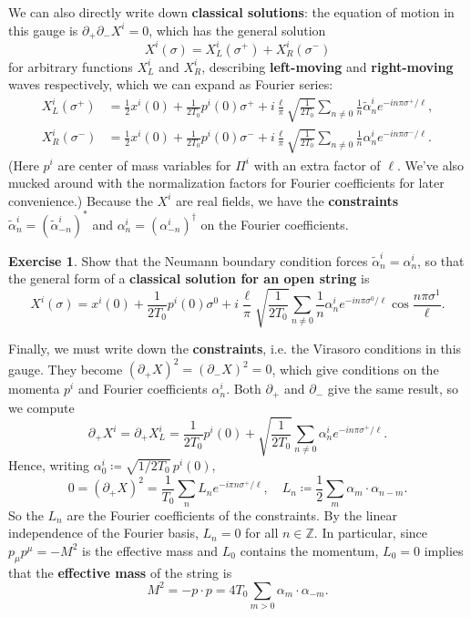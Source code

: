 \documentclass{report}
\theoremstyle{plain}
\theoremstyle{definition}
\newtheorem{exercise}{Exercise}[section]
\theoremstyle{remark}
\newcommand{\di}{\partial}
\newcommand{\bZ}{\mathbb{Z}}
\begin{document}
We can also directly write down {\bf classical solutions}: the
equation of motion in this gauge is $\di_+ \di_- X^i = 0$, which has
the general solution
\[ X^i(\sigma) = X^i_L(\sigma^+) + X^i_R(\sigma^-) \]
for arbitrary functions $X^i_L$ and $X^i_R$, describing {\bf
  left-moving} and {\bf right-moving} waves respectively, which we can
expand as Fourier series:
\begin{align*}
  X^i_L(\sigma^+) &= \frac{1}{2}x^i(0) + \frac{1}{2T_0} p^i(0) \sigma^+ + i\frac{\ell}{\pi}\sqrt{\frac{1}{2T_0}} \sum_{n \neq 0} \frac{1}{n} \tilde{\alpha}_n^i e^{-in\pi\sigma^+/\ell}, \\
  X^i_R(\sigma^-) &= \frac{1}{2}x^i(0) + \frac{1}{2T_0} p^i(0) \sigma^- + i\frac{\ell}{\pi}\sqrt{\frac{1}{2T_0}} \sum_{n \neq 0} \frac{1}{n} \alpha_n^i e^{-in\pi\sigma^-/\ell}.
\end{align*}
(Here $p^i$ are center of mass variables for $\Pi^i$ with an extra
factor of $\ell$. We've also mucked around with the normalization
factors for Fourier coefficients for later convenience.) Because the
$X^i$ are real fields, we have the {\bf constraints}
$\tilde{\alpha}^i_n = (\tilde{\alpha}^i_{-n})^*$ and $\alpha^i_n =
(\alpha^i_{-n})^\dag$ on the Fourier coefficients.

\begin{exercise}
  Show that the Neumann boundary condition forces $\tilde{\alpha}_n^i
  = \alpha_n^i$, so that the general form of a {\bf classical solution
    for an open string} is
  \[ X^i(\sigma) = x^i(0) + \frac{1}{2T_0}p^i(0)\sigma^0 + i\frac{\ell}{\pi}\sqrt{\frac{1}{2T_0}} \sum_{n \neq 0} \frac{1}{n} \alpha_n^i e^{-in\pi\sigma^0/\ell} \cos \frac{n\pi\sigma^1}{\ell}. \]
\end{exercise}

Finally, we must write down the {\bf constraints}, i.e. the Virasoro
conditions in this gauge. They become $(\di_+X)^2 = (\di_-X)^2 = 0$,
which give conditions on the momenta $p^i$ and Fourier coefficients
$\alpha_n^i$. Both $\di_+$ and $\di_-$ give the same result, so we
compute
\[ \di_+X^i = \di_+X^i_L = \frac{1}{2T_0} p^i(0) + \sqrt{\frac{1}{2T_0}} \sum_{n \neq 0} \alpha_n^i e^{-in\pi\sigma^+/\ell}. \]
Hence, writing $\alpha_0^i \coloneqq \sqrt{1/2T_0} \, p^i(0)$,
\[ 0 = (\di_+X)^2 = \frac{1}{T_0} \sum_n L_n e^{-i\pi n \sigma^+/\ell}, \quad L_n \coloneqq \frac{1}{2} \sum_m \alpha_m \cdot \alpha_{n-m}. \]
So the $L_n$ are the Fourier coefficients of the constraints. By the
linear independence of the Fourier basis, $L_n = 0$ for all $n \in
\bZ$. In particular, since $p_\mu p^\mu = -M^2$ is the effective mass
and $L_0$ contains the momentum, $L_0 = 0$ implies that the {\bf
  effective mass} of the string is
\[ M^2 = -p \cdot p = 4 T_0 \sum_{m > 0} \alpha_m \cdot \alpha_{-m}. \]
\end{document}
